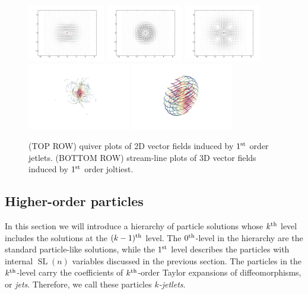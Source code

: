 \documentclass[12pt]{amsart}
\DeclareMathOperator{\SL}{SL}
\begin{document}
  \begin{figure}
  	\centering
        \includegraphics[width=0.3\textwidth]{./images/shear.pdf}
        \includegraphics[width=0.3\textwidth]{./images/spin.pdf}
        \includegraphics[width=0.3\textwidth]{./images/stretch.pdf}
        \\
        \includegraphics[width=0.4\textwidth]{./images/stretch_3D.png}
        \includegraphics[width=0.4\textwidth]{./images/shear_3D.png}
        \caption{(TOP ROW) quiver plots of 2D vector fields induced by $1^{\rm st}$ order jetlets. 
        (BOTTOM ROW) stream-line plots of 3D vector fields induced by $1^{\rm st}$ order joltiest.}
        \label{fig:zoo}
  \end{figure}

  \subsection{Higher-order particles}
  \label{sec:higher_order}
  In this section we will introduce a hierarchy of particle solutions whose $k^{\rm th}$ level includes the solutions at the $(k-1)^{\rm th}$ level.
  The $0^{\rm th}$-level in the hierarchy are the standard particle-like solutions,
  while the $1^{\rm st}$ level describes the particles with internal $\SL(n)$ variables
  discussed in the previous section.
  The particles in the $k^{\rm th}$-level carry the coefficients of
  $k^{\rm th}$-order Taylor expansions of diffeomorphisms,
  or \emph{jets}.
  Therefore, we call these particles \emph{$k$-jetlets}.
\end{document}

